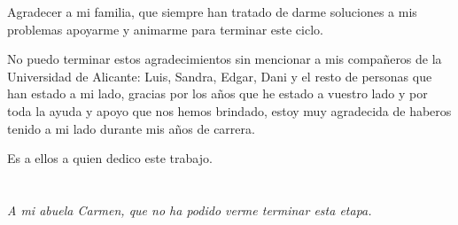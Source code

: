 Agradecer a mi familia, que siempre han tratado de darme soluciones a mis problemas apoyarme y animarme para terminar este ciclo.

No puedo terminar estos agradecimientos sin mencionar a mis compañeros de la Universidad de Alicante: Luis, Sandra, Edgar, Dani y el resto de personas que han estado a mi lado, gracias por los años que he estado a vuestro lado y por toda la ayuda y apoyo que nos hemos brindado, estoy muy agradecida de haberos tenido a mi lado durante mis años de carrera.

Es a ellos a quien dedico este trabajo.


\cleardoublepage %
\chapter*{}
\setlength{\leftmargin}{0.5\textwidth}
\setlength{\parsep}{0cm}
\addtolength{\topsep}{0.5cm}
\begin{flushright}
	\small\em{
		A mi abuela Carmen, que no ha podido verme terminar esta etapa.\\
	}
\end{flushright}

\cleardoublepage %
